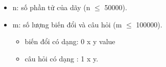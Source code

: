 \begin{itemize}
	\item n: số phần tử của dãy (n  $\le$  50000).
	\item m: số lượng biến đổi và câu hỏi (m  $\le$  100000).
\begin{itemize}
	\item biến đổi có dạng: 0 x y value
	\item câu hỏi có dạng : 1 x y.
\end{itemize}
\end{itemize}

\
